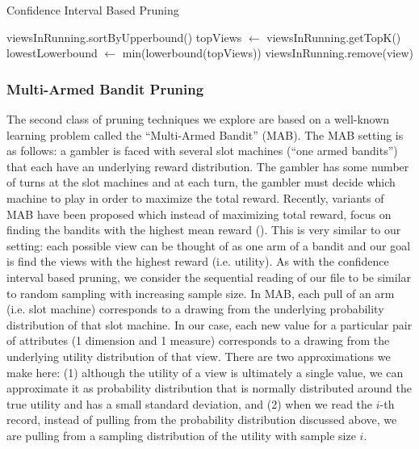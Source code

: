 \begin{algorithm}
\caption{Confidence Interval Based Pruning}
\label{algo:ci_based_pruning}
\begin{algorithmic}[1]
\State viewsInRunning.sortByUpperbound()
\State topViews $\gets$ viewsInRunning.getTopK()
\State lowestLowerbound $\gets$ min(lowerbound(topViews))
\State viewsInRunning.remove(view)
\EndIf
\EndFor
\end{algorithmic}
\end{algorithm}

\subsubsection{Multi-Armed Bandit Pruning}
\label{sec:multi_armed_bandit}
The second class of pruning techniques we explore are based on a
well-known learning problem called the ``Multi-Armed Bandit'' (MAB).
The MAB setting is as follows: a gambler is faced with several slot
machines (``one armed bandits'') that each have an underlying reward
distribution. 
The gambler has some number of turns at the slot machines and at
each turn, the gambler must decide which machine to play in order to maximize
the total reward.
Recently, variants of MAB have been proposed which instead of maximizing total
reward, focus on finding the bandits with the highest
mean reward (\cite{}).
This is very similar to our setting: each possible view can be thought of as
one arm of a bandit and our goal is find the views with the highest reward (i.e.
utility).
As with the confidence interval based pruning, we consider the sequential
reading of our file to be similar to random sampling with increasing sample
size.
In MAB, each pull of an arm (i.e. slot machine) corresponds to a drawing from
the underlying probability distribution of that slot machine.
In our case, each new value for a particular pair of attributes (1 dimension and
1 measure) corresponds to a drawing from the underlying utility distribution
of that view.
There are two approximations we make here: (1) although the utility of a
view is ultimately a single value, we can approximate it as probability
distribution that is normally distributed around the true utility and has a
small standard deviation, and (2) when we read the $i$-th record, instead of
pulling from the probability distribution discussed above, we are pulling from a
sampling distribution of the utility with sample size $i$.

